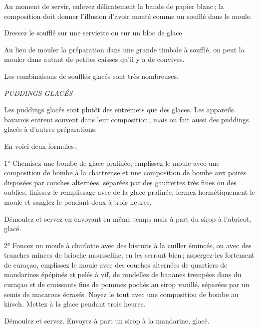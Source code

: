 Au moment de servir, enlevez délicatement la bande de papier blanc ; la
composition doit donner l'illusion d'avoir monté comme un soufflé dans le
moule.

Dressez le soufflé sur une serviette ou sur un bloc de glace.

\medskip

Au lieu de mouler la préparation dans une grande timbale à soufflé, on peut la
mouler dans autant de petites caisses qu'il y a de convives.

\medskip

Les combinaisons de soufflés glacés sont très nombreuses.

\bigskip

\begin{center}
\textit{PUDDINGS GLACÉS}
\end{center}

\bigskip

Les puddings glacés sont plutôt des entremets que des glaces. Les appareils
bavarois entrent souvent dans leur composition ; mais on fait aussi des
puddings glacés à d'autres préparations.

\medskip

En voici deux formules :

\medskip

1° Chemisez une bombe de glace pralinée, emplissez le moule avec une
composition de bombe à la chartreuse et une composition de bombe aux poires
disposées par couches alternées, séparées par des gaufrettes très fines ou des
oublies, finissez le remplissage avec de la glace pralinée, fermez
hermétiquement le moule et sanglez-le pendant deux à trois heures.

Démoulez et servez en envoyant en même temps mais à part du sirop à l'abricot,
glacé.

2° Foncez un moule à charlotte avec des biscuits à la cuiller émincés, ou avec
des tranches minces de brioche mousseline, en les serrant bien ; aspergez-les
fortement de curaçao, emplissez le moule avec des couches alternées de
quartiers de mandarines épépinés et pelés à vif, de rondelles de bananes
trempées dans du curaçao et de croissants fins de pommes pochés au sirop
vanillé, séparées par un semis de macarons écrasés. Noyez le tout avec une
composition de bombe au kirsch. Mettez à la glace pendant trois heures.

Démoulez et servez. Envoyez à part un sirop à la mandarine, glacé.
